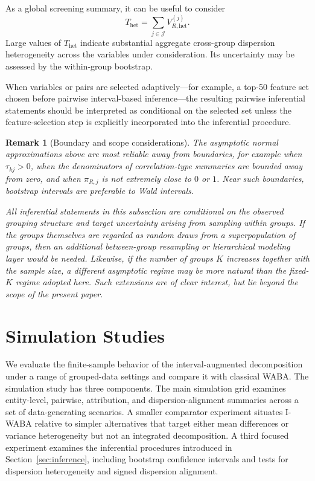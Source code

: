 \documentclass[preprint, times, 12pt, authoryear]{elsarticle}
\newtheorem{remark}{Remark}
\begin{document}
As a global screening summary, it can be useful to consider
\begin{equation}\label{eq:global_heterogeneity}
	T_{\mathrm{het}}
	=
	\sum_{j\in\mathcal J} V_{R,\mathrm{het}}^{(j)}.
\end{equation}
Large values of $T_{\mathrm{het}}$ indicate substantial aggregate cross-group dispersion heterogeneity across the variables under consideration. Its uncertainty may be assessed by the within-group bootstrap.

When variables or pairs are selected adaptively---for example, a top-50 feature set chosen before pairwise interval-based inference---the resulting pairwise inferential statements should be interpreted as conditional on the selected set unless the feature-selection step is explicitly incorporated into the inferential procedure.

\begin{remark}[Boundary and scope considerations]\label{rem:boundary_inference}
	The asymptotic normal approximations above are most reliable away from boundaries, for example when $\tau_{kj}>0$, when the denominators of correlation-type summaries are bounded away from zero, and when $\pi_{R,j}$ is not extremely close to $0$ or $1$. Near such boundaries, bootstrap intervals are preferable to Wald intervals.
	
	All inferential statements in this subsection are conditional on the observed grouping structure and target uncertainty arising from sampling within groups. If the groups themselves are regarded as random draws from a superpopulation of groups, then an additional between-group resampling or hierarchical modeling layer would be needed. Likewise, if the number of groups $K$ increases together with the sample size, a different asymptotic regime may be more natural than the fixed-\(K\) regime adopted here. Such extensions are of clear interest, but lie beyond the scope of the present paper.
\end{remark}

\section{Simulation Studies}\label{sec:simulation}

We evaluate the finite-sample behavior of the interval-augmented decomposition under a range of grouped-data settings and compare it with classical WABA. The simulation study has three components. The main simulation grid examines entity-level, pairwise, attribution, and dispersion-alignment summaries across a set of data-generating scenarios. A smaller comparator experiment situates I-WABA relative to simpler alternatives that target either mean differences or variance heterogeneity but not an integrated decomposition. A third focused experiment examines the inferential procedures introduced in Section~\ref{sec:inference}, including bootstrap confidence intervals and tests for dispersion heterogeneity and signed dispersion alignment.
\end{document}

